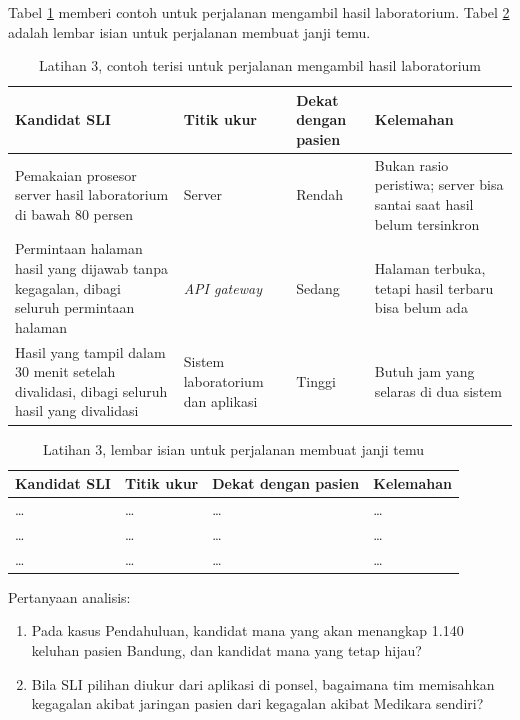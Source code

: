 Tabel \ref{tab:ch11-lat3-contoh} memberi contoh untuk perjalanan mengambil hasil laboratorium.
Tabel \ref{tab:ch11-lat3-hasil} adalah lembar isian untuk perjalanan membuat janji temu.

\begin{table}[!htb]
  \centering
  \caption{Latihan 3, contoh terisi untuk perjalanan mengambil hasil laboratorium}
  \label{tab:ch11-lat3-contoh}
  \footnotesize
  \begin{tabularx}{\textwidth}{>{\raggedright\arraybackslash}p{2.6cm} >{\raggedright\arraybackslash}p{2.0cm} >{\raggedright\arraybackslash}p{1.6cm} >{\raggedright\arraybackslash}X}
    \hline
    \textbf{Kandidat SLI} & \textbf{Titik ukur} & \textbf{Dekat dengan pasien} & \textbf{Kelemahan} \\ \hline
    Pemakaian prosesor server hasil laboratorium di bawah 80 persen & Server & Rendah & Bukan
      rasio peristiwa; server bisa santai saat hasil belum tersinkron \\ \hline
    Permintaan halaman hasil yang dijawab tanpa kegagalan, dibagi seluruh permintaan halaman &
      \textit{API gateway} & Sedang & Halaman terbuka, tetapi hasil terbaru bisa belum ada \\ \hline
    Hasil yang tampil dalam 30 menit setelah divalidasi, dibagi seluruh hasil yang divalidasi &
      Sistem laboratorium dan aplikasi & Tinggi & Butuh jam yang selaras di dua sistem \\ \hline
  \end{tabularx}
\end{table}

\begin{table}[!htb]
  \centering
  \caption{Latihan 3, lembar isian untuk perjalanan membuat janji temu}
  \label{tab:ch11-lat3-hasil}
  \footnotesize
  \begin{tabularx}{\textwidth}{>{\raggedright\arraybackslash}p{2.6cm} >{\raggedright\arraybackslash}p{2.0cm} >{\raggedright\arraybackslash}p{1.6cm} >{\raggedright\arraybackslash}X}
    \hline
    \textbf{Kandidat SLI} & \textbf{Titik ukur} & \textbf{Dekat dengan pasien} & \textbf{Kelemahan} \\ \hline
    \dots & \dots & \dots & \dots \\ \hline
    \dots & \dots & \dots & \dots \\ \hline
    \dots & \dots & \dots & \dots \\ \hline
  \end{tabularx}
\end{table}

Pertanyaan analisis:
\begin{enumerate}
  \item Pada kasus Pendahuluan, kandidat mana yang akan menangkap 1.140 keluhan pasien Bandung,
        dan kandidat mana yang tetap hijau?
  \item Bila SLI pilihan diukur dari aplikasi di ponsel, bagaimana tim memisahkan kegagalan
        akibat jaringan pasien dari kegagalan akibat Medikara sendiri?
\end{enumerate}
